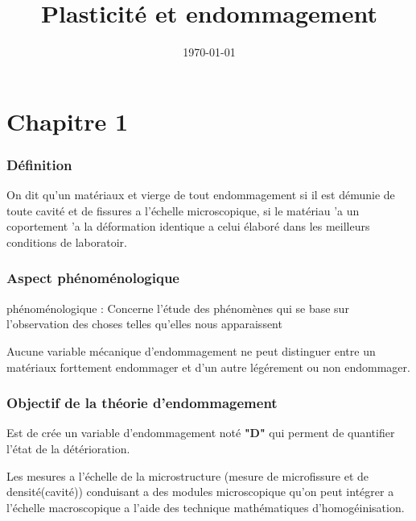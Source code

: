 \documentclass[12pt,a4paper]{article}
\title{Plasticité et endommagement}
\author{}
\date{\today}
\begin{document}
	
	
	\maketitle
	
	\tableofcontents
	
	\newpage
	
	\part{Chapitre 1}
	
	\section{Définition}
	
	On dit qu'un matériaux et vierge de tout endommagement si il est démunie de toute cavité et de fissures a l'échelle microscopique,
	si le matériau 'a un coportement 'a la déformation identique a celui élaboré dans les meilleurs conditions de laboratoir.
	
	\section{Aspect phénoménologique}
	
	phénoménologique : Concerne l'étude des phénomènes qui se base sur l'observation des choses telles qu'elles nous apparaissent
	
	\vspace{\baselineskip}
	
	Aucune variable mécanique d'endommagement ne peut distinguer entre un matériaux forttement endommager et d'un autre légérement ou non endommager.
	
	\section{Objectif de la théorie d'endommagement}
	
	Est de crée un variable d'endommagement noté \textbf{"D"} qui perment de quantifier l'état de la détérioration.
	
	\vspace{\baselineskip}
	
	Les mesures a l'échelle de la microstructure \big(mesure de microfissure et de densité(cavité)\big) conduisant a des modules microscopique qu'on peut intégrer a l'échelle macroscopique a l'aide des technique mathématiques d'homogéinisation.
	
\end{document}
